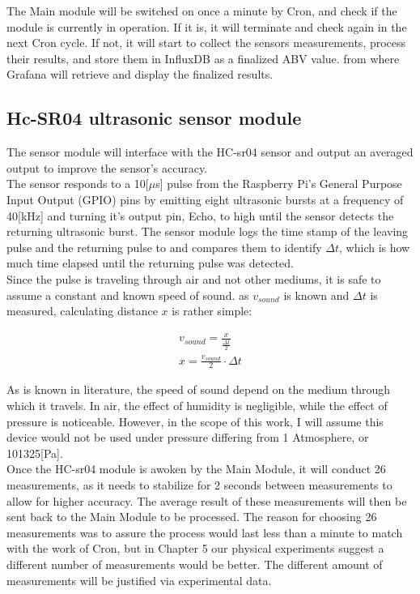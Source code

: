 \documentclass[twoside]{ctuthesis}
\theoremstyle{plain}
\theoremstyle{definition}
\theoremstyle{note}
\begin{document}
The Main module will be switched on once a minute by Cron, and check if the module is currently in operation. If it is, it will terminate and check again in the next Cron cycle. If not, it will start to collect the sensors measurements, process their results, and store them in InfluxDB as a finalized ABV value. from where Grafana will retrieve and display the finalized results.

\subsection{Hc-SR04 ultrasonic sensor module}
The sensor module will interface with the HC-sr04 sensor and output an averaged output to improve the sensor's accuracy.\\
The sensor responds to a 10[$\mu$s] pulse from the Raspberry Pi's General Purpose Input Output (GPIO) pins by emitting eight ultrasonic bursts at a frequency of 40[kHz] and turning it's output pin, Echo, to high until the sensor detects the returning ultrasonic burst. The sensor module logs the time stamp of the leaving pulse and the returning pulse to and compares them to identify $\Delta t$, which is how much time elapsed until the returning pulse was detected.\\

Since the pulse is traveling through air and not other mediums, it is safe to assume a constant and known speed of sound. as $v_{sound}$ is known and $\Delta t$ is measured, calculating distance $x$ is rather simple:

\begin{gather} \nonumber
v_{sound} = \frac{x}{\frac{\Delta t}{2}}\\
x = \frac{v_{sound}}{2}\cdot \Delta t
\end{gather}

As is known in literature, the speed of sound depend on the medium through which it travels. In air, the effect of humidity is negligible, while the effect of pressure is noticeable\cite{Sound}. However, in the scope of this work, I will assume this device would not be used under pressure differing from 1 Atmosphere, or 101325[Pa].\\ 
Once the HC-sr04 module is awoken by the Main Module, it will conduct 26 measurements, as it needs to stabilize for 2 seconds between measurements to allow for higher accuracy. The average result of these measurements will then be sent back to the Main Module to be processed. The reason for choosing 26 measurements was to assure the process would last less than a minute to match with the work of Cron, but in Chapter 5 our physical experiments suggest a different number of measurements would be better. The different amount of measurements will be justified via experimental data.
\end{document}
